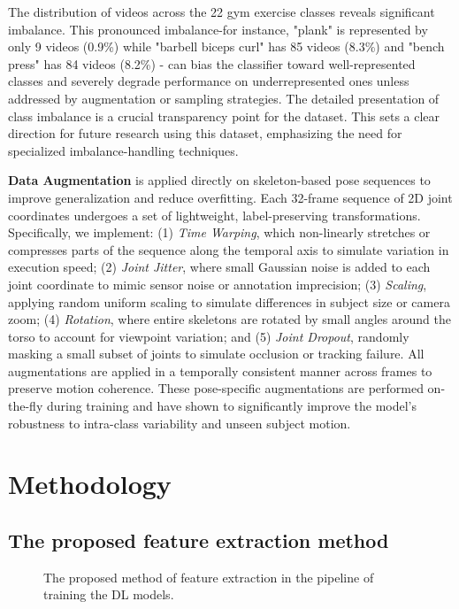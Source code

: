 \documentclass[runningheads]{llncs}
\begin{document}
The distribution of videos across the 22 gym exercise classes reveals significant imbalance. This pronounced imbalance-for instance, "plank" is represented by only 9 videos (0.9\%) while "barbell biceps curl" has 85 videos (8.3\%) and "bench press" has 84 videos (8.2\%) - can bias the classifier toward well-represented classes and severely degrade performance on underrepresented ones unless addressed by augmentation or sampling strategies. The detailed presentation of class imbalance is a crucial transparency point for the dataset. This sets a clear direction for future research using this dataset, emphasizing the need for specialized imbalance-handling techniques.

\textbf{Data Augmentation} is applied directly on skeleton-based pose sequences to improve generalization and reduce overfitting. Each 32-frame sequence of 2D joint coordinates undergoes a set of lightweight, label-preserving transformations. Specifically, we implement: (1) \textit{Time Warping}, which non-linearly stretches or compresses parts of the sequence along the temporal axis to simulate variation in execution speed; (2) \textit{Joint Jitter}, where small Gaussian noise is added to each joint coordinate to mimic sensor noise or annotation imprecision; (3) \textit{Scaling}, applying random uniform scaling to simulate differences in subject size or camera zoom; (4) \textit{Rotation}, where entire skeletons are rotated by small angles around the torso to account for viewpoint variation; and (5) \textit{Joint Dropout}, randomly masking a small subset of joints to simulate occlusion or tracking failure. All augmentations are applied in a temporally consistent manner across frames to preserve motion coherence. These pose-specific augmentations are performed on-the-fly during training and have shown to significantly improve the model's robustness to intra-class variability and unseen subject motion.\cite{ko2024augmentation}

\section{Methodology}

\subsection{The proposed feature extraction method}

\begin{figure}[!h]
    \begin{center}
        \resizebox{0.98\textwidth}{!}{}
        \caption{The proposed method of feature extraction in the pipeline of training the DL models.}
    \end{center}
    \label{fig:propFs}
\end{figure}
\end{document}
